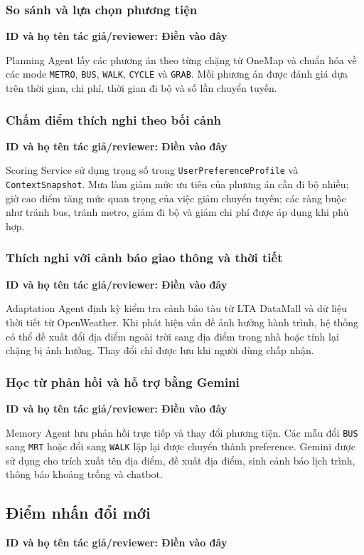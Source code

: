 \documentclass[12pt,a4paper]{article}
\newcommand{\tacgia}{%
  \begin{tcolorbox}[colback=blue!3,colframe=blue!25,boxrule=0.4pt,arc=1mm]
    \small\textbf{ID và họ tên tác giả/reviewer: Điền vào đây}
  \end{tcolorbox}
}
\begin{document}
\subsubsection{So sánh và lựa chọn phương tiện}
\tacgia
Planning Agent lấy các phương án theo từng chặng từ OneMap và chuẩn hóa về các mode \texttt{METRO}, \texttt{BUS}, \texttt{WALK}, \texttt{CYCLE} và \texttt{GRAB}. Mỗi phương án được đánh giá dựa trên thời gian, chi phí, thời gian đi bộ và số lần chuyển tuyến.

\subsubsection{Chấm điểm thích nghi theo bối cảnh}
\tacgia
Scoring Service sử dụng trọng số trong \texttt{UserPreferenceProfile} và \texttt{ContextSnapshot}. Mưa làm giảm mức ưu tiên của phương án cần đi bộ nhiều; giờ cao điểm tăng mức quan trọng của việc giảm chuyển tuyến; các ràng buộc như tránh bus, tránh metro, giảm đi bộ và giảm chi phí được áp dụng khi phù hợp.

\subsubsection{Thích nghi với cảnh báo giao thông và thời tiết}
\tacgia
Adaptation Agent định kỳ kiểm tra cảnh báo tàu từ LTA DataMall và dữ liệu thời tiết từ OpenWeather. Khi phát hiện vấn đề ảnh hưởng hành trình, hệ thống có thể đề xuất đổi địa điểm ngoài trời sang địa điểm trong nhà hoặc tính lại chặng bị ảnh hưởng. Thay đổi chỉ được lưu khi người dùng chấp nhận.

\subsubsection{Học từ phản hồi và hỗ trợ bằng Gemini}
\tacgia
Memory Agent lưu phản hồi trực tiếp và thay đổi phương tiện. Các mẫu đổi \texttt{BUS} sang \texttt{MRT} hoặc đổi sang \texttt{WALK} lặp lại được chuyển thành preference. Gemini được sử dụng cho trích xuất tên địa điểm, đề xuất địa điểm, sinh cảnh báo lịch trình, thông báo khoảng trống và chatbot.

\subsection{Điểm nhấn đổi mới}
\tacgia
\end{document}
